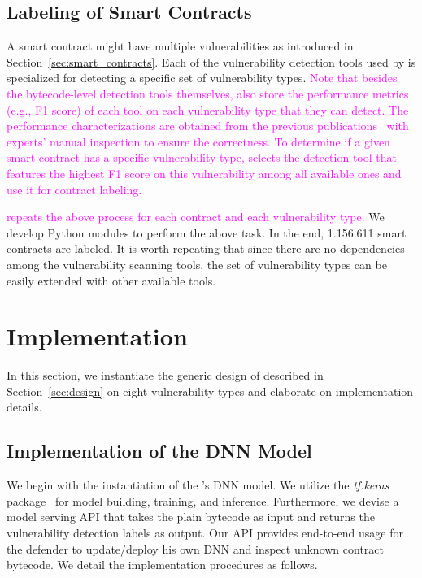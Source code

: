 \subsection{Labeling of Smart Contracts}
\label{sec:implementation:preclassification}
\vspace{-0.2em}

A smart contract might have multiple vulnerabilities as introduced in Section~\ref{sec:smart_contracts}. 
Each of the vulnerability detection tools used by \datatool{} is specialized for detecting a specific set of vulnerability types. 
\textcolor{magenta}{Note that besides the bytecode-level detection tools themselves, \datatool{} also store the performance metrics (e.g., F1 score) of each tool on each vulnerability type that they can detect. The performance characterizations are obtained from the previous publications~\cite{rw_oyente_repo,rw_mythril_repo,dedaub} with experts' manual inspection to ensure the correctness. 
To determine if a given smart contract has a specific vulnerability type, \datatool{} selects the detection tool that features the highest F1 score on this vulnerability among all available ones and use it for contract labeling. }

\textcolor{magenta}{\datatool{} repeats the above process for each contract and each vulnerability type.} 
We develop Python modules to perform the above task.
In the end, 1.156.611 smart contracts are labeled. It is worth repeating that since there are no dependencies among the vulnerability scanning tools, the set of vulnerability types can be easily extended with other available tools. 
\vspace{-0.2em}
\section{Implementation}
\label{sec:implementation}
\vspace{-0.2em}
In this section, we instantiate the generic design of \sys{} described in Section~\ref{sec:design} on eight
vulnerability types and elaborate on implementation details.

\vspace{-0.3em}
\subsection{Implementation of the DNN Model}
\label{sec:implementation:dl}
\vspace{-0.2em}

We begin with the instantiation of the \sys{}'s DNN model.
We utilize the \textit{tf.keras} package~\cite{tensorflow} for model building, training, and inference.
Furthermore, we devise a model serving API that takes the plain bytecode as input and returns the vulnerability detection labels as output. Our API provides end-to-end usage for the defender to update/deploy his own DNN and inspect unknown contract bytecode.
We detail the implementation procedures as follows. 

